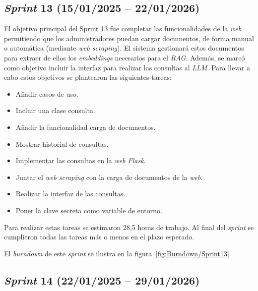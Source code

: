 \subsection{\textit{Sprint} 13 (15/01/2025 -- 22/01/2026)}
El objetivo principal del \href{https://github.com/lbr1014/TFG_RAG/milestone/13?closed=1}{Sprint 13} fue completar las funcionalidades de la \textit{web} permitiendo que los administradores puedan cargar documentos, de forma manual o automática (mediante \textit{web scraping}). El sistema gestionará estos documentos para extraer de ellos los \textit{embeddings} necesarios para el \textit{RAG}. Además, se marcó como objetivo incluir la interfaz para realizar las consultas al \textit{LLM}. Para llevar a cabo estos objetivos se plantearon las siguientes tareas:
\begin{itemize}
\tightlist
	\item Añadir casos de uso.
	\item Incluir una clase consulta.
	\item Añadir la funcionalidad carga de documentos.
	\item Mostrar historial de consultas.
	\item Implementar las consultas en la \textit{web Flask}.
	\item Juntar el \textit{web scraping} con la carga de documentos de la \textit{web}.
	\item Realizar la interfaz de las consultas.
	\item Poner la clave secreta como variable de entorno.
\end{itemize}

Para realizar estas tareas se estimaron 28,5 horas de trabajo. Al final del \textit{sprint} se cumplieron todas las tareas más o menos en el plazo esperado.

El \textit{burndown} de este \textit{sprint} se ilustra en la figura~\ref{fig:Burndown/Sprint13}.

\subsection{\textit{Sprint} 14 (22/01/2025 -- 29/01/2026)}

